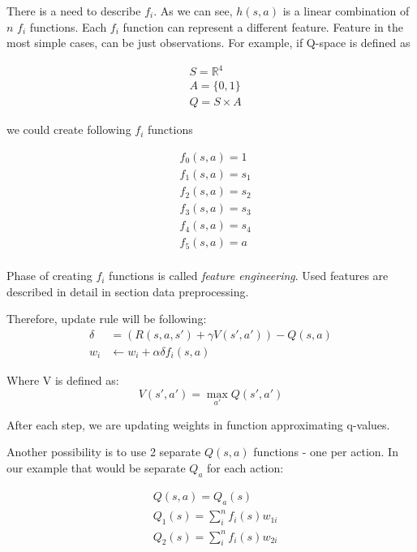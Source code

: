 \documentclass[12pt]{article}
\begin{document}
There is a need to describe $f_i$. As we can see, $h(s,a)$ is a linear combination of $n$ $f_i$ functions. Each $f_i$ function can represent a different feature. Feature in the most simple cases, can be just observations. For example, if Q-space is defined as 

\begin{equation}
\begin{aligned}
&S = \mathbb{R}^4 \\
&A = \{0, 1\} \\
&Q = S \times A
\end{aligned}
\end{equation}

we could create following $f_i$ functions

\begin{equation}
\begin{aligned}
&f_0(s, a) = 1 \\
&f_1(s, a) = s_1 \\
&f_2(s, a) = s_2 \\
&f_3(s, a) = s_3 \\
&f_4(s, a) = s_4 \\
&f_5(s, a) = a \\
\end{aligned}
\end{equation}


Phase of creating $f_i$ functions is called \emph{feature engineering}. Used features are described in detail in section data preprocessing.

Therefore, update rule will be following:
\begin{equation}
\begin{aligned}
\delta&=(R(s,a,s')+\gamma V(s',a'))-Q(s,a) \\
w_i &\leftarrow w_i+\alpha \delta f_i (s,a)
\end{aligned}
\end{equation}

Where V is defined as:
\begin{equation}
V(s',a' )=\max_{a'}Q(s',a')
\end{equation}

After each step, we are updating weights in function approximating q-values.

Another possibility is to use 2 separate $Q(s,a)$ functions - one per action. In our example that would be separate $Q_a$ for each action:

\begin{equation}
\begin{aligned}
&Q(s, a) = Q_a(s) \\
&Q_1(s) = \sum_i^n f_i(s)w_{1i} \\
&Q_2(s) = \sum_i^n f_i(s)w_{2i} \\
\end{aligned}
\end{equation}
\end{document}
